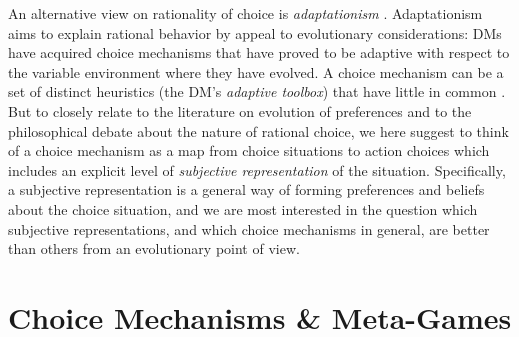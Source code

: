 \documentclass[fleqn,reqno,12pt]{article}
\theoremstyle{Satz}
\theoremstyle{Bsp}
\begin{document}
An alternative view on rationality of choice is \emph{adaptationism}
\citep[e.g.,][]{Anderson1991:Is-human-cognit,ChaterOaksford2000:The-Rational-An,HagenChater2012:Decision-Making}. Adaptationism
aims to explain rational behavior by appeal to evolutionary considerations: DMs have acquired
choice mechanisms that have proved to be adaptive with respect to the variable environment
where they have evolved. A choice mechanism can be a set of distinct heuristics (the DM's
\emph{adaptive toolbox}) that have little in common
\citep[e.g.,][]{TverskyKahnemann1981:The-Framing-of-,GigerenzerGoldstein1996:Reasoning-the-F,ScheibehenneRieskamp2013:Testing-the-Ada}. But
to closely relate to the literature on evolution of preferences and to the philosophical debate
about the nature of rational choice, we here suggest to think of a choice mechanism
as a map from choice situations to action choices which includes an explicit level of
\emph{subjective representation} of the situation. Specifically, a subjective representation is a general way of forming preferences and beliefs about the choice situation, and we
are most interested in the question which subjective representations, and which choice mechanisms in general, are better than others
from an evolutionary point of view.


\section{Choice Mechanisms  \& Meta-Games} 
\label{sec:subj-ut,bel,dec-rules}
\end{document}
